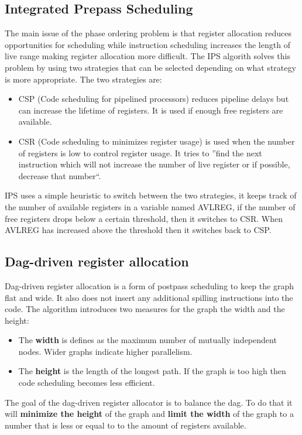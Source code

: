 \documentclass[a4paper,10pt]{article}
\begin{document}
\subsection{Integrated Prepass Scheduling}
The main issue of the phase ordering problem is that register allocation reduces opportunities for scheduling while instruction scheduling
increases the length of live range making register allocation more difficult. The IPS algorith solves this problem by using two strategies
that can be selected depending on what strategy is more appropriate. The two strategies are:
\begin{itemize}
 \item CSP (Code scheduling for pipelined processors) reduces pipeline delays but can increase the lifetime of registers. It is used if
       enough free registers are available.
 \item CSR (Code scheduling to minimizes register usage) is used when the number of registers is low to control register usage. It tries
to ''find the next instruction which will not increase the number of live register or if possible, decrease that number``.
\end{itemize}
IPS uses a simple heuristic to switch between the two strategies, it keeps track of the number of available registers in a variable named
AVLREG, if the number of free registers drops below a certain threshold, then it switches to CSR. When AVLREG has increased above the
threshold then it switches back to CSP.

\subsection{Dag-driven register allocation}
Dag-driven register allocation is a form of postpass scheduling to keep the graph flat and wide. It also does not insert any
additional spilling instructions into the code. The algorithm introduces two measures for the graph the width and the height:
\begin{itemize}
 \item The \textbf{width} is defines as the maximum number of mutually independent nodes. Wider graphs indicate higher parallelism.
 \item The \textbf{height} is the length of the longest path. If the graph is too high then code scheduling becomes less efficient.
\end{itemize}
The goal of the dag-driven register allocator is to balance the dag. To do that it will \textbf{minimize the height} of the graph and
\textbf{limit the width} of the graph to a number that is less or equal to to the amount of registers available.
\end{document}
